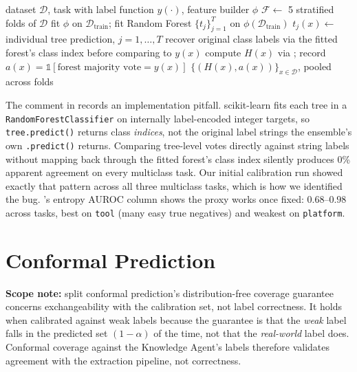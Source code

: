 \documentclass[preprint,12pt]{elsarticle}
\begin{document}
\begin{algorithm}[htbp]
\caption{RF tree-vote entropy, 5-fold out-of-fold}
\label{alg:rf-entropy}
\begin{algorithmic}[1]
\Require dataset $\mathcal{D}$, task with label function $y(\cdot)$, feature builder $\phi$
\State $\mathcal{F} \gets$ 5 stratified folds of $\mathcal{D}$
  \State fit $\phi$ on $\mathcal{D}_{\mathrm{train}}$; fit Random Forest $\{t_j\}_{j=1}^T$ on $\phi(\mathcal{D}_{\mathrm{train}})$
    \State $t_j(x) \gets$ individual tree prediction, $j=1,\dots,T$ 
    \State recover original class labels via the fitted forest's class index before comparing to $y(x)$
    \State compute $H(x)$ via ; record $a(x) = \mathbb{1}[\text{forest majority vote} = y(x)]$
  \EndFor
\EndFor
\State \Return $\{(H(x), a(x))\}_{x \in \mathcal{D}}$, pooled across folds
\end{algorithmic}
\end{algorithm}

The comment in  records an implementation pitfall.
scikit-learn \citep{pedregosa2011scikit} fits each tree in a
\texttt{RandomForestClassifier} on internally label-encoded integer
targets, so \texttt{tree.predict()} returns class \emph{indices}, not the
original label strings the ensemble's own \texttt{.predict()} returns.
Comparing tree-level votes directly against string labels without mapping
back through the fitted forest's class index silently produces 0\% apparent
agreement on every multiclass task. Our initial calibration run showed
exactly that pattern across all three multiclass tasks, which is how we
identified the bug. 's entropy AUROC column shows the
proxy works once fixed: $0.68$--$0.98$ across tasks, best on \texttt{tool}
(many easy true negatives) and weakest on \texttt{platform}.

\section{Conformal Prediction}
\label{sec:conformal}
\textbf{Scope note:} split conformal prediction's distribution-free coverage
guarantee concerns exchangeability with the calibration set, not label
correctness. It holds when calibrated against weak labels because the
guarantee is that the \emph{weak} label falls in the predicted set
$(1-\alpha)$ of the time, not that the \emph{real-world} label does. Conformal
coverage against the Knowledge Agent's labels therefore validates agreement
with the extraction pipeline, not correctness.
\end{document}
